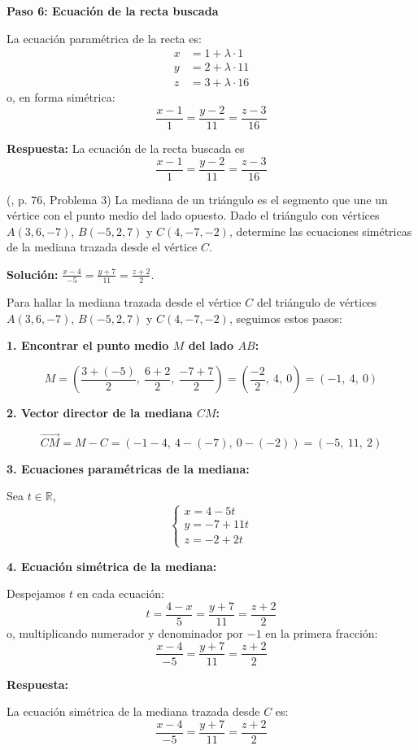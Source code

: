 \begin{prob}
\begin{myproof}
\textbf{Paso 6: Ecuación de la recta buscada}

La ecuación paramétrica de la recta es:
\[
\boxed{
\begin{aligned}
x &= 1 + \lambda \cdot 1 \\
y &= 2 + \lambda \cdot 11 \\
z &= 3 + \lambda \cdot 16
\end{aligned}
}
\]
o, en forma simétrica:
\[
\boxed{
\frac{x - 1}{1} = \frac{y - 2}{11} = \frac{z - 3}{16}
}
\]

\textbf{Respuesta:}  
La ecuación de la recta buscada es
\[
\boxed{
\frac{x - 1}{1} = \frac{y - 2}{11} = \frac{z - 3}{16}
}
\]
\end{myproof}

\end{prob}

\begin{prob} (\cite{espinoza2006Algebralineal}, p. 76, Problema 3) La mediana de un triángulo es el segmento que une un vértice con el punto medio del lado opuesto. Dado el triángulo con vértices $A(3,6,-7)$, $B(-5,2,7)$ y $C(4,-7,-2)$, determine las ecuaciones simétricas de la mediana trazada desde el vértice $C$. 

\textbf{Solución:} $\frac{x-4}{-5}=\frac{y+7}{11}=\frac{z+2}{2}$.

\begin{myproof}
Para hallar la mediana trazada desde el vértice $C$ del triángulo de vértices $A(3,6,-7)$, $B(-5,2,7)$ y $C(4,-7,-2)$, seguimos estos pasos:

\textbf{1. Encontrar el punto medio $M$ del lado $AB$:}

\[
M = \left( \frac{3 + (-5)}{2},\ \frac{6 + 2}{2},\ \frac{-7 + 7}{2} \right )
= \left( \frac{-2}{2},\ 4,\ 0 \right )
= (-1,\ 4,\ 0)
\]

\textbf{2. Vector director de la mediana $CM$:}

\[
\vec{CM} = M - C = (-1 - 4,\ 4 - (-7),\ 0 - (-2)) = (-5,\ 11,\ 2)
\]

\textbf{3. Ecuaciones paramétricas de la mediana:}

Sea $t \in \mathbb{R}$,
\[
\begin{cases}
x = 4 - 5t \\
y = -7 + 11t \\
z = -2 + 2t
\end{cases}
\]

\textbf{4. Ecuación simétrica de la mediana:}

Despejamos $t$ en cada ecuación:
\[
t = \frac{4 - x}{5} = \frac{y + 7}{11} = \frac{z + 2}{2}
\]
o, multiplicando numerador y denominador por $-1$ en la primera fracción:
\[
\frac{x - 4}{-5} = \frac{y + 7}{11} = \frac{z + 2}{2}
\]

\textbf{Respuesta:}

La ecuación simétrica de la mediana trazada desde $C$ es:
\[
\boxed{
\frac{x - 4}{-5} = \frac{y + 7}{11} = \frac{z + 2}{2}
}
\]
\end{myproof}

\end{prob}

